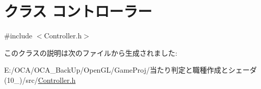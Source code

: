 \hypertarget{class_xE3_x82_xB3_xE3_x83_xB3_xE3_x83_x88_xE3_x83_xAD_xE3_x83_xBC_xE3_x83_xA9_xE3_x83_xBC}{\section{クラス コントローラー}
\label{class_xE3_x82_xB3_xE3_x83_xB3_xE3_x83_x88_xE3_x83_xAD_xE3_x83_xBC_xE3_x83_xA9_xE3_x83_xBC}
}


{\ttfamily \#include $<$Controller.\-h$>$}



このクラスの説明は次のファイルから生成されました\-:\begin{DoxyCompactItemize}
\item 
E\-:/\-O\-C\-A/\-O\-C\-A\-\_\-\-Back\-Up/\-Open\-G\-L/\-Game\-Proj/当たり判定と職種作成とシェーダ(10\-\_)/src/\hyperlink{_controller_8h}{Controller.\-h}\end{DoxyCompactItemize}
